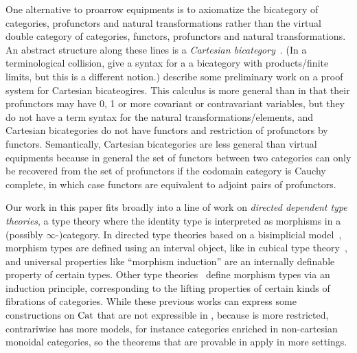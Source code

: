 \documentclass{llncs}
\begin{document}
One alternative to proarrow equipments is to axiomatize the bicategory
of categories, profunctors and natural transformations rather than the
virtual double category of categories, functors, profunctors and natural
transformations. An abstract structure along these lines is a
\emph{Cartesian
  bicategory}~\citet{carboni-walters,carboni-walters-someonelese}.  (In
a terminological collision, \citet{fioresaville} give a syntax for a a
bicategory with products/finite limits, but this is a different notion.)
\citet{jonasfreycartesianbicategories} describe some preliminary work on
a proof system for Cartesian bicateogires.  This calculus is more
general than \vett{} in that their profunctors may have 0, 1 or more
covariant or contravariant variables, but they do not have a term syntax
for the natural transformations/elements, and Cartesian bicategories do
not have functors and restriction of profunctors by
functors. Semantically, Cartesian bicategories are less general
than virtual equipments because in general the set of functors between
two categories can only be recovered from the set of profunctors if the
codomain category is Cauchy complete, in which case functors are
equivalent to adjoint pairs of profunctors.

Our work in this paper fits broadly into a line of work on
\emph{directed dependent type theories}, a type theory where the
identity type is interpreted as morphisms in a (possibly
$\infty$-)category.  In directed type theories based on a bisimplicial
model~\cite{riehlshulman17directed,buchholtzweinberger21fibered,weinberger22thesis,WeaverLicata20},
morphism types are defined using an interval object, like in cubical
type
theory~\cite{bch18,cchm18cubical,angiuli+18cartesian-csl,abcfhl17cartesian},
and universal properties like ``morphism induction'' are an internally
definable property of certain types.  Other type
theories~\cite{north18,ahrens+22semantics-2dtt} define morphism types via an induction
principle, corresponding to the lifting properties of certain kinds of
fibrations of categories.  While these previous works can express some
constructions on $\textrm{Cat}$ that are not expressible in \vett{}, because
\vett{} is more restricted, \vett{} contrariwise has more models, for
instance categories enriched in non-cartesian monoidal categories, so
the theorems that are provable in \vett{} apply in more settings.

\end{document}
